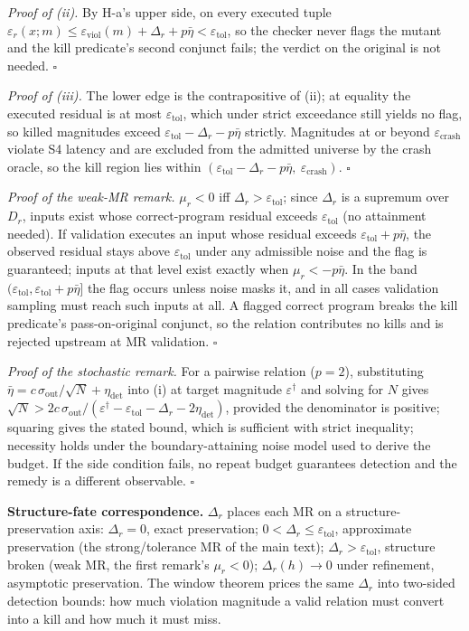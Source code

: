 \documentclass[manuscript,screen,review]{acmart}
\begin{document}
\emph{Proof of (ii).} By H-a's upper side, on every executed tuple
$\varepsilon_r(x; m) \leq \varepsilon_{\mathrm{viol}}(m) + \Delta_r + p\bar\eta < \varepsilon_{\mathrm{tol}}$,
so the checker never flags the mutant and the kill predicate's second
conjunct fails; the verdict on the original is not needed. $\square$

\emph{Proof of (iii).} The lower edge is the contrapositive of (ii); at
equality the executed residual is at most $\varepsilon_{\mathrm{tol}}$,
which under strict exceedance still yields no flag, so killed magnitudes
exceed
$\varepsilon_{\mathrm{tol}} - \Delta_r - p\bar\eta$
strictly. Magnitudes at or beyond $\varepsilon_{\mathrm{crash}}$ violate
S4 latency and are excluded from the admitted universe by the crash
oracle, so the kill region lies within
$(\varepsilon_{\mathrm{tol}} - \Delta_r - p\bar\eta,\ \varepsilon_{\mathrm{crash}})$.
$\square$

\emph{Proof of the weak-MR remark.} $\mu_r < 0$ iff
$\Delta_r > \varepsilon_{\mathrm{tol}}$; since $\Delta_r$ is a supremum
over $D_r$, inputs exist whose correct-program residual exceeds
$\varepsilon_{\mathrm{tol}}$ (no attainment needed). If validation
executes an input whose residual exceeds
$\varepsilon_{\mathrm{tol}} + p\bar\eta$, the observed residual stays
above $\varepsilon_{\mathrm{tol}}$ under any admissible noise and the
flag is guaranteed; inputs at that level exist exactly when
$\mu_r < -p\bar\eta$. In the band
$(\varepsilon_{\mathrm{tol}}, \varepsilon_{\mathrm{tol}} + p\bar\eta]$
the flag occurs unless noise masks it, and in all cases validation
sampling must reach such inputs at all. A flagged correct program
breaks the kill predicate's pass-on-original conjunct, so the relation
contributes no kills and is rejected upstream at MR validation.
$\square$

\emph{Proof of the stochastic remark.} For a pairwise relation
($p = 2$), substituting
$\bar\eta = c\,\sigma_{\mathrm{out}}/\sqrt{N} + \eta_{\mathrm{det}}$
into (i) at target magnitude $\varepsilon^\dagger$ and solving for $N$
gives
$\sqrt{N} > 2c\,\sigma_{\mathrm{out}}/(\varepsilon^\dagger - \varepsilon_{\mathrm{tol}} - \Delta_r - 2\eta_{\mathrm{det}})$,
provided the denominator is positive; squaring gives the stated bound,
which is sufficient with strict inequality; necessity holds under the
boundary-attaining noise model used to derive the budget. If the side
condition fails, no repeat budget guarantees detection and the remedy
is a different observable. $\square$

\textbf{Structure-fate correspondence.} $\Delta_r$ places each MR on a
structure-preservation axis: $\Delta_r = 0$, exact preservation;
$0 < \Delta_r \leq \varepsilon_{\mathrm{tol}}$, approximate
preservation (the strong/tolerance MR of the main text);
$\Delta_r > \varepsilon_{\mathrm{tol}}$, structure broken (weak MR, the
first remark's $\mu_r < 0$); $\Delta_r(h) \to 0$ under refinement,
asymptotic preservation. The window theorem prices the same $\Delta_r$
into two-sided detection bounds: how much violation magnitude a valid
relation must convert into a kill and how much it must miss.
\end{document}
